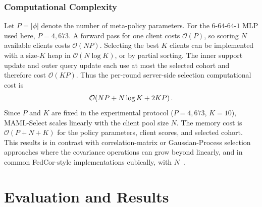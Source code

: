 \documentclass[journal]{IEEEtran}
\newcommand{\revision}[1]{#1}
\begin{document}
\subsubsection{Computational Complexity}
\revision{Let $P=|\phi|$ denote the number of meta-policy parameters. For the $6$-$64$-$64$-$1$ MLP used here, $P=4{,}673$. A forward pass for one client costs $\mathcal{O}(P)$, so scoring $N$ available clients costs $\mathcal{O}(NP)$. Selecting the best $K$ clients can be implemented with a size-$K$ heap in $\mathcal{O}(N\log K)$, or by partial sorting. The inner support update and outer query update each use at most the selected cohort and therefore cost $\mathcal{O}(KP)$. Thus the per-round server-side selection computational cost is}
\begin{equation}
	\color{black}
	\mathcal{O}\!\left(NP + N\log K + 2KP\right).
	\label{eq:selector_complexity}
\end{equation}
\revision{Since $P$ and $K$ are fixed in the experimental protocol ($P=4{,}673$, $K=10$), MAML-Select scales linearly with the client pool size $N$. The memory cost is $\mathcal{O}(P+N+K)$ for the policy parameters, client scores, and selected cohort. This results is in contrast with correlation-matrix or Gaussian-Process selection approaches where the covariance operations can grow beyond linearly, and in common FedCor-style implementations cubically, with $N$~\cite{tang2022fedcor}.}

\section{Evaluation and Results}
\end{document}
